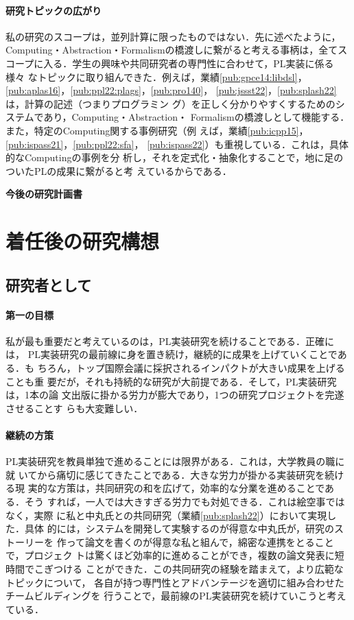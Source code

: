 \documentclass[dvipdfmx]{jsarticle}
\begin{document}
\paragraph{研究トピックの広がり}
私の研究のスコープは，並列計算に限ったものではない．先に述べたように，
Computing・Abstraction・Formalismの橋渡しに繋がると考える事柄は，全てス
コープに入る．学生の興味や共同研究者の専門性に合わせて，PL実装に係る様々
なトピックに取り組んできた．例えば，業績\ref{pub:gpce14:libdsl}，
\ref{pub:aplas16}，\ref{pub:ppl22:plags}，\ref{pub:pro140}，
\ref{pub:jssst22}，\ref{pub:splash22}は，計算の記述（つまりプログラミン
グ）を正しく分かりやすくするためのシステムであり，Computing・Abstraction・
Formalismの橋渡しとして機能する．また，特定のComputing関する事例研究（例
えば，業績\ref{pub:icpp15}，\ref{pub:ispass21}，\ref{pub:ppl22:sfa}，
\ref{pub:ispass22}）も重視している．これは，具体的なComputingの事例を分
析し，それを定式化・抽象化することで，地に足のついたPLの成果に繋がると考
えているからである．

\newpage
\begin{center}
\LARGE\bfseries 今後の研究計画書
\end{center}

\section*{着任後の研究構想}

\subsection*{研究者として}

\paragraph{第一の目標}
私が最も重要だと考えているのは，PL実装研究を続けることである．正確には，
PL実装研究の最前線に身を置き続け，継続的に成果を上げていくことである．も
ちろん，トップ国際会議に採択されるインパクトが大きい成果を上げることも重
要だが，それも持続的な研究が大前提である．そして，PL実装研究は，1本の論
文出版に掛かる労力が膨大であり，1つの研究プロジェクトを完遂させることす
らも大変難しい．

\paragraph{継続の方策}
PL実装研究を教員単独で進めることには限界がある．これは，大学教員の職に就
いてから痛切に感じてきたことである．大きな労力が掛かる実装研究を続ける現
実的な方策は，共同研究の和を広げて，効率的な分業を進めることである．そう
すれば，一人では大きすぎる労力でも対処できる．これは絵空事ではなく，実際
に私と中丸氏との共同研究（業績\ref{pub:splash22}）において実現した．具体
的には，システムを開発して実験するのが得意な中丸氏が，研究のストーリーを
作って論文を書くのが得意な私と組んで，綿密な連携をとることで，プロジェク
トは驚くほど効率的に進めることができ，複数の論文発表に短時間でこぎつける
ことができた．この共同研究の経験を踏まえて，より広範なトピックについて，
各自が持つ専門性とアドバンテージを適切に組み合わせたチームビルディングを
行うことで，最前線のPL実装研究を続けていこうと考えている．
\end{document}
